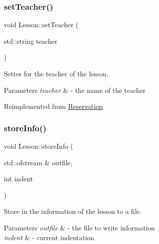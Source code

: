 \mbox{\label{class_lesson_acbfde853aea74c9f2a3a6d50a4812705}} 
\subsubsection{\texorpdfstring{set\+Teacher()}{setTeacher()}}
{\footnotesize\ttfamily void Lesson\+::set\+Teacher (\begin{DoxyParamCaption}\item[{std\+::string}]{teacher }\end{DoxyParamCaption})\hspace{0.3cm}{\ttfamily [virtual]}}



Setter for the teacher of the lesson. 


\begin{DoxyParams}{Parameters}
{\em teacher} & -\/ the name of the teacher \\
\hline
\end{DoxyParams}


Reimplemented from \mbox{\hyperlink{class_reservation_afa8eadd14292a52c6a404078690a7f87}{Reservation}}.

\mbox{\label{class_lesson_a645855060ab3c915a6e0875bc5584887}} 
\subsubsection{\texorpdfstring{store\+Info()}{storeInfo()}}
{\footnotesize\ttfamily void Lesson\+::store\+Info (\begin{DoxyParamCaption}\item[{std\+::ofstream \&}]{outfile,  }\item[{int}]{indent }\end{DoxyParamCaption})\hspace{0.3cm}{\ttfamily [virtual]}}



Store in the information of the lesson to a file. 


\begin{DoxyParams}{Parameters}
{\em outfile} & -\/ the file to write information \\
\hline
{\em indent} & -\/ current indentation \\
\hline
\end{DoxyParams}


